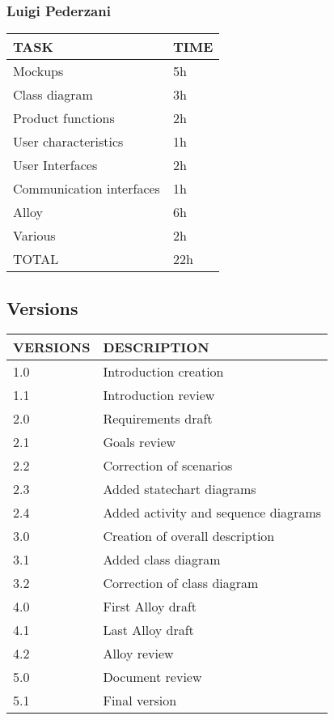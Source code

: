 \subsubsection{Luigi Pederzani}
\hfill
\begin{center}
	\begin{tabular}{ | l | p{6cm} | } 
		\hline
		TASK & TIME \\ 
		\hline
		Mockups & 5h  \\ 
		\hline
		Class diagram & 3h  \\ 
		\hline
		Product functions & 2h \\ 
		\hline
		User characteristics & 1h \\ 
		\hline
		User Interfaces & 2h \\ 
		\hline
		Communication interfaces & 1h \\ 
		\hline
		Alloy & 6h   \\ 
		\hline
		Various & 2h  \\ 
		\hline
		TOTAL & 22h \\ 
		\hline
	\end{tabular}
\end{center}

\newpage
\subsection{Versions}
\hfill
\hfill
\begin{center}
	\begin{tabular}{ | l | p{6cm} | } 
		\hline
			VERSIONS & DESCRIPTION  \\ 
		\hline
		1.0 & Introduction creation   \\ 
		\hline
		1.1 & Introduction review  \\ 
		\hline
		2.0 & Requirements draft \\ 
		\hline
		2.1 & Goals review \\ 
		\hline
		2.2 & Correction of scenarios \\ 
		\hline
		2.3 & Added statechart diagrams   \\ 
		\hline
		2.4 & Added activity and sequence diagrams  \\ 
		\hline
		3.0 & Creation of overall description \\ 
		\hline
		3.1 & Added class diagram \\ 
		\hline
		3.2 & Correction of class diagram \\ 
		\hline
		4.0 & First Alloy draft  \\ 
		\hline
		4.1 & Last Alloy draft \\ 
		\hline
		4.2 & Alloy review \\ 
		\hline
		5.0 & Document review \\ 
		\hline
		5.1 & Final version \\ 
		\hline
	\end{tabular}
\end{center}